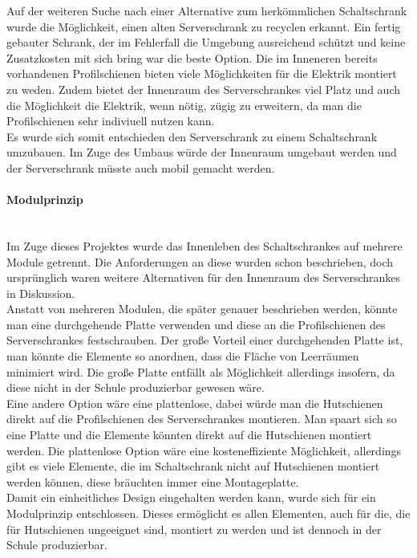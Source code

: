    Auf der weiteren Suche nach einer Alternative zum herkömmlichen Schaltschrank wurde die Möglichkeit, einen alten Serverschrank zu recyclen erkannt. Ein fertig gebauter Schrank, der im Fehlerfall die Umgebung ausreichend schützt und keine Zusatzkosten mit sich bring war die beste Option. Die im Inneneren bereits vorhandenen Profilschienen bieten viele Möglichkeiten für die Elektrik montiert zu weden. Zudem bietet der Innenraum des Serverschrankes viel Platz und auch die Möglichkeit die Elektrik, wenn nötig, zügig zu erweitern, da man die Profilschienen sehr indiviuell nutzen kann.\\
    Es wurde sich somit entschieden den Serverschrank zu einem Schaltschrank umzubauen. Im Zuge des Umbaus würde der Innenraum umgebaut werden und der Serverschrank müsste auch mobil gemacht werden. 
    \paragraph{Modulprinzip}\mbox{}\\
    Im Zuge dieses Projektes wurde das Innenleben des Schaltschrankes auf mehrere Module getrennt. Die Anforderungen an diese wurden schon beschrieben, doch ursprünglich waren weitere Alternativen für den Innenraum des Serverschrankes in Diskussion.\\
    Anstatt von mehreren Modulen, die später genauer beschrieben werden, könnte man eine durchgehende Platte verwenden und diese an die Profilschienen des Serverschrankes festschrauben. Der große Vorteil einer durchgehenden Platte ist, man könnte die Elemente so anordnen, dass die Fläche von Leerräumen  minimiert wird. Die große Platte entfällt als Möglichkeit allerdings insofern, da diese nicht in der Schule produzierbar gewesen wäre.\\
    Eine andere Option wäre eine plattenlose, dabei würde man die Hutschienen direkt auf die Profilschienen des Serverschrankes montieren. Man spaart sich so eine Platte und die Elemente könnten direkt auf die Hutschienen montiert werden.
    Die plattenlose Option wäre eine kosteneffiziente Möglichkeit, allerdings gibt es viele Elemente, die im Schaltschrank nicht auf Hutschienen montiert werden können, diese bräuchten immer eine Montageplatte.\\
    Damit ein einheitliches Design eingehalten werden kann, wurde sich für ein Modulprinzip entschlossen. Dieses ermöglicht es allen Elementen, auch für die, die für Hutschienen ungeeignet sind, montiert zu werden und ist dennoch in der Schule produzierbar.

